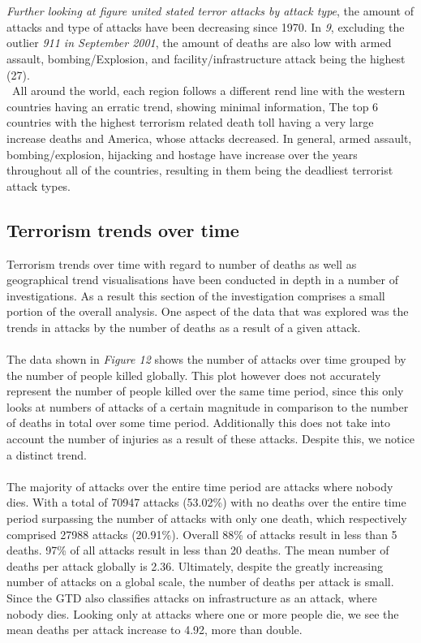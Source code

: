 \documentclass[10pt,a4paper]{article}
\begin{document}
\\\\
\textit{Further looking at figure united stated terror attacks by attack type}, the amount of attacks and type of attacks have been decreasing since 1970. In \textit{9}, excluding the outlier \textit{911 in September 2001}, the amount of deaths are also low with armed assault, bombing/Explosion, and facility/infrastructure attack being the highest (27).
\\\
All around the world, each region follows a different rend line with the western countries having an erratic trend, showing minimal information, The top 6 countries with the highest terrorism related death toll having a very large increase deaths and America, whose attacks decreased. In general, armed assault, bombing/explosion, hijacking and hostage have increase over the years throughout all of the countries, resulting in them being the deadliest terrorist attack types.

\subsection{Terrorism trends over time}

Terrorism trends over time with regard to number of deaths as well as geographical trend visualisations have been conducted in depth in a number of investigations. 
As a result this section of the investigation comprises a small portion of the overall analysis. 
One aspect of the data that was explored was the trends in attacks by the number of deaths as a result of a given attack.
\\\\
The data shown in \textit{Figure 12} shows the number of attacks over time grouped by the number of people killed globally. 
This plot however does not accurately represent the number of people killed over the same time period, since this only looks at numbers of attacks of a certain magnitude in comparison to the number of deaths in total over some time period.
Additionally this does not take into account the number of injuries as a result of these attacks. 
Despite this, we notice a distinct trend. 
\\\\
The majority of attacks over the entire time period are attacks where nobody dies. 
With a total of 70947 attacks (53.02\%) with no deaths over the entire time period surpassing the number of attacks with only one death, which respectively comprised 27988 attacks (20.91\%).
Overall 88\% of attacks result in less than 5 deaths. 
97\% of all attacks result in less than 20 deaths.
The mean number of deaths per attack globally is 2.36. 
Ultimately, despite the greatly increasing number of attacks on a global scale, the number of deaths per attack is small. 
Since the GTD also classifies attacks on infrastructure as an attack, where nobody dies.
Looking only at attacks where one or more people die, we see the mean deaths per attack  increase to 4.92, more than double.
\\\\
\end{document}
